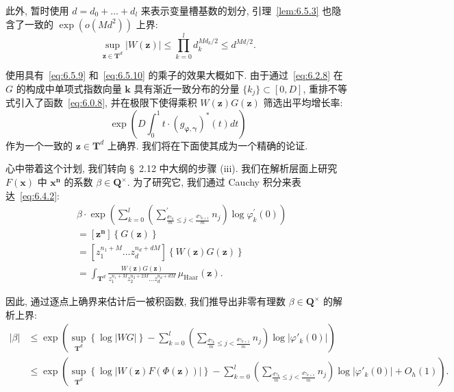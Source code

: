 此外, 暂时使用 $d = d_0 + \dots + d_l$ 来表示变量槽基数的划分, 引理~\ref{lem:6.5.3} 也隐含了一致的 $\exp(o(M d^2))$ 上界:
\begin{equation}\label{eq:6.5.10}
\sup_{\mathbf{z} \in \mathbf{T}^d} |W(\mathbf{z})| \le \prod_{k=0}^l d_k^{Md_k/2} \le d^{Md/2}.
\end{equation}

使用具有~\eqref{eq:6.5.9} 和~\eqref{eq:6.5.10} 的乘子的效果大概如下.
由于通过~\eqref{eq:6.2.8} 在 $G$ 的构成中单项式指数向量 $\mathbf{k}$ 具有渐近一致分布的分量 $\{k_j\} \subset [0, D]$, 重排不等式引入了函数~\eqref{eq:6.0.8}, 并在极限下使得乘积 $W(\mathbf{z})G(\mathbf{z})$ 筛选出平均增长率:
\[ \exp\left(D\int_0^1 t \cdot (g_{\boldsymbol{\varphi},\boldsymbol{\gamma}})^*(t) dt\right) \]
作为一个一致的 $\mathbf{z} \in \mathbf{T}^d$ 上确界.
我们将在下面使其成为一个精确的论证.

心中带着这个计划, 我们转向 \S~2.12 中大纲的步骤 (iii).
我们在解析层面上研究 $F(\mathbf{x})$ 中 $\mathbf{x}^{\mathbf{n}}$ 的系数 $\beta \in \mathbf{Q}^{\times}$.
为了研究它, 我们通过 Cauchy 积分来表达~\eqref{eq:6.4.2}:
\begin{equation}\label{eq:6.5.11}
\begin{aligned}
&\beta \cdot \exp\left(\sum_{k=0}^{l} \left(\sum_{\frac{d\gamma_k}{m} \le j < \frac{d\gamma_{k+1}}{m}}^{\prime} n_j\right) \log \varphi_k^{\prime}(0)\right) \\
&= [\mathbf{z}^{\mathbf{n}}] \left\{G(\mathbf{z})\right\} \\
&= \left[z_1^{n_1+M} \dots z_d^{n_d+dM}\right] \left\{W(\mathbf{z})G(\mathbf{z})\right\} \\
&= \int_{\mathbf{T}^d} \frac{W(\mathbf{z})G(\mathbf{z})}{z_1^{n_1+M} z_2^{n_2+2M} \dots z_d^{n_d+dM}} \, \mu_{\text{Haar}}(\mathbf{z}).
\end{aligned}
\end{equation}

因此, 通过逐点上确界来估计后一被积函数, 我们推导出非零有理数 $\beta \in \mathbf{Q}^{\times}$ 的解析上界:
\begin{align}
|\beta| &\le \exp\left(\sup_{\mathbf{T}^{d}} \left\{\log|WG|\right\} - \sum_{k=0}^{l} \left(\sum_{\frac{d\gamma_{k}}{m} \le j < \frac{d\gamma_{k+1}}{m}} n_{j}\right) \log|\varphi'_{k}(0)|\right) \nonumber\\
&\le \exp\left(\sup_{\mathbf{T}^{d}} \left\{\log|W(\mathbf{z})F(\Phi(\mathbf{z}))|\right\} - \sum_{k=0}^{l} \left(\sum_{\frac{d\gamma_{k}}{m} \le j < \frac{d\gamma_{k+1}}{m}} n_{j}\right) \log|\varphi'_{k}(0)| + O_{h}(1)\right).\label{eq:6.5.12}
\end{align}

